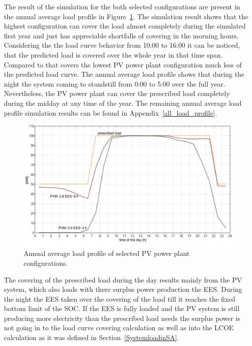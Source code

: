 The result of the simulation for the both selected configurations are present in the annual average load profile in Figure~\ref{PV_annual_profil}. The simulation result shows that the highest configuration can cover the load almost completely during the simulated first year and just has appreciable shortfalls of covering in the morning hours. Considering the the load curve behavior from 10:00 to 16:00 it can be noticed, that the predicted load is covered over the whole year in that time span. Compared to that covers the lowest PV power plant configuration much less of the predicted load curve. The  annual average load profile shows that during the night the system coming to standstill from 0:00 to 5:00 over the full year. Nevertheless, the PV power plant can cover the prescribed load completely during the midday at any time of the year. The remaining  annual average load profile simulation results can be found in Appendix~\ref{all_load_profile}.

\begin{figure}[htbp]  
\centering
\includegraphics[width=0.8\linewidth]{FIG/PV_annual_profil}
\caption[Annual average load profile of selected PV power plant configurations.]{Annual average load profile of selected PV power plant configurations.}\label{PV_annual_profil}
\end{figure}
The covering of the prescribed load during the day results mainly from the PV system, which also loads with there surplus power production the EES. During the night the EES taken over the covering of the load till it reaches the fixed bottom limit of the SOC. If the EES is fully loaded and the PV system is still producing more electricity than the prescribed load needs the surplus power is not going in to the load curve covering calculation as well as into the LCOE calculation as it was defined in Section~\ref{SystemloadinSA}. 

